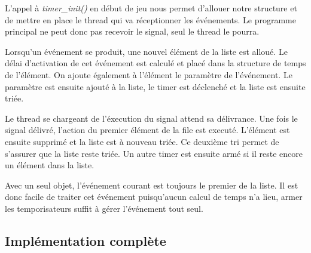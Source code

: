 \documentclass[10pt,a4paper]{article}
\begin{document}
	L'appel à \textit{timer\_init()} en début de jeu nous permet d'allouer notre structure et de mettre en place le thread qui va réceptionner les événements. Le programme principal ne peut donc pas recevoir le signal, seul le thread le pourra. 
	
	Lorsqu'un événement se produit, une nouvel élément de la liste est alloué. Le délai d'activation de cet événement est calculé et placé dans la structure de temps de l'élément. On ajoute également à l'élément le paramètre de l'événement. Le paramètre est ensuite ajouté à la liste, le timer est déclenché et la liste est ensuite triée.
	
	Le thread se chargeant de l'éxecution du signal attend sa délivrance. Une fois le signal délivré, l'action du premier élément de la file est executé. L'élément est ensuite supprimé et la liste est à nouveau triée. Ce deuxième tri permet de s'assurer que la liste reste triée. Un autre timer est ensuite armé si il reste encore un élément dans la liste.
	
	Avec un seul objet, l'événement courant est toujours le premier de la liste. Il est donc facile de traiter cet événement puisqu'aucun calcul de temps n'a lieu, armer les temporisateurs suffit à gérer l'événement tout seul.
	
	\subsection{Implémentation complète} 
\end{document}
